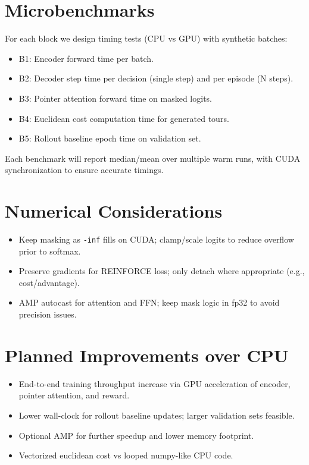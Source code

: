 \documentclass[11pt]{article}
\begin{document}
\section{Microbenchmarks}
For each block we design timing tests (CPU vs GPU) with synthetic batches:
\begin{itemize}[noitemsep]
  \item B1: Encoder forward time per batch.
  \item B2: Decoder step time per decision (single step) and per episode (N steps).
  \item B3: Pointer attention forward time on masked logits.
  \item B4: Euclidean cost computation time for generated tours.
  \item B5: Rollout baseline epoch time on validation set.
\end{itemize}
Each benchmark will report median/mean over multiple warm runs, with CUDA synchronization to ensure accurate timings.

\section{Numerical Considerations}
\begin{itemize}[noitemsep]
  \item Keep masking as \texttt{-inf} fills on CUDA; clamp/scale logits to reduce overflow prior to softmax.
  \item Preserve gradients for REINFORCE loss; only detach where appropriate (e.g., cost/advantage).
  \item AMP autocast for attention and FFN; keep mask logic in fp32 to avoid precision issues.
\end{itemize}

\section{Planned Improvements over CPU}
\begin{itemize}[noitemsep]
  \item End-to-end training throughput increase via GPU acceleration of encoder, pointer attention, and reward.
  \item Lower wall-clock for rollout baseline updates; larger validation sets feasible.
  \item Optional AMP for further speedup and lower memory footprint.
  \item Vectorized euclidean cost vs looped numpy-like CPU code.
\end{itemize}
\end{document}
